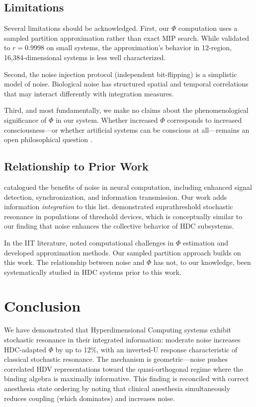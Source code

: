 \documentclass[12pt,a4paper]{article}
\begin{document}
\subsection{Limitations}

Several limitations should be acknowledged. First, our $\Phi$ computation uses a sampled partition approximation rather than exact MIP search. While validated to $r = 0.9998$ on small systems, the approximation's behavior in 12-region, 16,384-dimensional systems is less well characterized.

Second, the noise injection protocol (independent bit-flipping) is a simplistic model of noise. Biological noise has structured spatial and temporal correlations \citep{faisal2008noise} that may interact differently with integration measures.

Third, and most fundamentally, we make no claims about the phenomenological significance of $\Phi$ in our system. Whether increased $\Phi$ corresponds to increased consciousness---or whether artificial systems can be conscious at all---remains an open philosophical question \citep{chalmers2010character, tononi2015integrated}.

\subsection{Relationship to Prior Work}

\citet{mcdonnell2011benefits} catalogued the benefits of noise in neural computation, including enhanced signal detection, synchronization, and information transmission. Our work adds information \emph{integration} to this list. \citet{stocks2000suprathreshold} demonstrated suprathreshold stochastic resonance in populations of threshold devices, which is conceptually similar to our finding that noise enhances the collective behavior of HDC subsystems.

In the IIT literature, \citet{barrett2011practical} noted computational challenges in $\Phi$ estimation and developed approximation methods. Our sampled partition approach builds on this work. The relationship between noise and $\Phi$ has not, to our knowledge, been systematically studied in HDC systems prior to this work.

\section{Conclusion}

We have demonstrated that Hyperdimensional Computing systems exhibit stochastic resonance in their integrated information: moderate noise increases HDC-adapted $\Phi$ by up to 12\%, with an inverted-U response characteristic of classical stochastic resonance. The mechanism is geometric---noise pushes correlated HDV representations toward the quasi-orthogonal regime where the binding algebra is maximally informative. This finding is reconciled with correct anesthesia state ordering by noting that clinical anesthesia simultaneously reduces coupling (which dominates) and increases noise.
\end{document}
